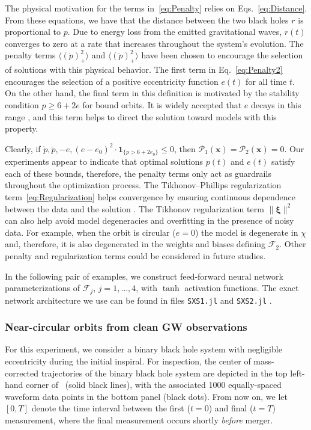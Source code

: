 \documentclass[ reprint,
nofootinbib,
 amsmath,amssymb,
 aps,
]{revtex4-2}
\begin{document}
The physical motivation for the terms in~\cref{eq:Penalty} relies on Eqs.~\cref{eq:Distance}.
From these equations, we have that the distance between the two black holes $r$ is proportional to $p$.
Due to energy loss from the emitted gravitational waves, $r(t)$ converges to zero at a rate
that increases throughout the system's evolution. 
The penalty terms $\langle (\dot{p})_+^2 \rangle$ and $\langle (\ddot{p})_+^2 \rangle$ have been chosen to encourage the selection of solutions with this physical behavior.
The first term in Eq.~\cref{eq:Penalty2} encourages the selection of a
positive eccentricity function $e(t)$ for all time $t$.
On the other hand, the final term in this definition is motivated by the stability condition $p \geq 6+2e$ for bound orbits.
It is widely accepted that $e$ decays in this range \cite{cutler1994gravitational}, and this term helps to direct the solution toward models with this property.


Clearly, if $\dot{p},\ddot{p},-e,(e-e_0)^2\cdot \bm{1}_{\{p>6+2e_0\}} \leq 0$, then $\mathcal{P}_1(\mathbf{x}) = \mathcal{P}_2(\mathbf{x}) = 0$.
Our experiments appear to indicate that optimal solutions $p(t)$ and $e(t)$ satisfy each of these bounds, therefore, the penalty terms only act as guardrails throughout the optimization process.
The Tikhonov--Phillips regularization term~\cref{eq:Regularization} helps convergence by ensuring continuous dependence between the data and the solution \cite{benning_burger_2018}.
The Tikhonov regularization term $\|\bm{\xi}\|^2$ can also help avoid model degeneracies and overfitting in the presence of noisy data.
For example, when the orbit is circular ($e=0$)
the model is degenerate in $\chi$ and, therefore, it is also degenerated in the weights and biases defining $\mathcal{F}_2$.
Other penalty and regularization terms could be considered in future studies.

In the following pair of examples, we construct feed-forward neural network parameterizations of $\mathcal{F}_j$, $j=1,\ldots,4$, with $\tanh$ activation functions.
The exact network architecture we use can be found in files \texttt{SXS1.jl} and \texttt{SXS2.jl} \cite{JuliaCode}.

\subsubsection{Near-circular orbits from clean GW observations} \label{ssub:low_eccentricity_orbit}

For this experiment, we consider a binary black hole system with negligible eccentricity during the initial inspiral.
For inspection, the center of mass-corrected trajectories of the binary black hole system are depicted in the top left-hand corner of~ (solid black lines), with the associated 1000 equally-spaced waveform data points
in the bottom panel (black dots).
From now on, we let $[0,T]$ denote the time interval between the first ($t=0$) and final ($t=T$) measurement, where the final measurement occurs shortly \emph{before} merger.
\end{document}
